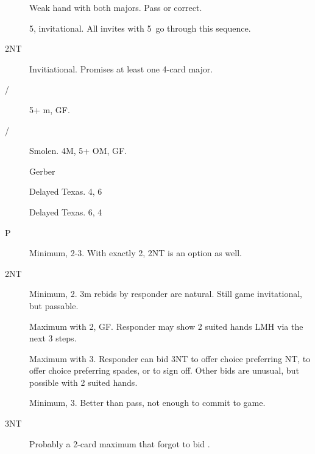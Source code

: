 \documentclass[tom-ari]{subfiles}
\begin{document}
\begin{description}
  \item[] Weak hand with both majors. Pass or correct.
  \item[] 5\spadesuit, invitational. All invites with 5\spadesuit ~go through this sequence. %
  \item[2NT] Invitiational. Promises at least one 4-card major.
  \item[/] 5+ m, GF.
  \item[/] Smolen. 4M, 5+ OM, GF.
  \item[] Gerber
  \item[] Delayed Texas. 4\spadesuit, 6\heartsuit
  \item[] Delayed Texas. 6\spadesuit, 4\heartsuit
\end{description}

\begin{description}
  \item[P] Minimum, 2-3\spadesuit. With exactly 2, 2NT is an option as well.
  \item[2NT] Minimum, 2\spadesuit. 3m rebids by responder are natural. Still game invitational, but passable.
  \item[] Maximum with 2\spadesuit, GF. Responder may show 2 suited hands LMH via the next 3 steps.
  \item[] Maximum with 3\spadesuit. Responder can bid 3NT to offer choice preferring NT,  to offer choice preferring spades, or  to sign off.
              Other bids are unusual, but possible with 2 suited hands.
  \item[] Minimum, 3\spadesuit. Better than pass, not enough to commit to game.
  \item[3NT] Probably a 2-card maximum that forgot to bid .
\end{description}
\end{document}

